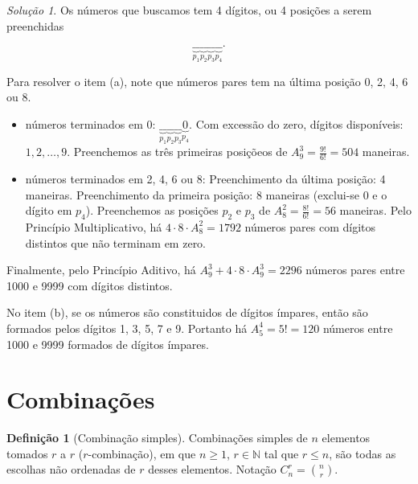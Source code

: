 \documentclass[]{book}
\theoremstyle{definition}
\newtheorem{definition}{Definição}[chapter]
\theoremstyle{definition}
\theoremstyle{definition}
\theoremstyle{remark}
\newtheorem*{solution}{Solução}
\begin{document}
\begin{solution}
\iffalse{} {Solução. } \fi{}Os números que buscamos tem 4 dígitos, ou 4 posições a serem preenchidas

\[
  \underbrace{\_\_}_{p_1}\underbrace{\_\_}_{p_2}\underbrace{\_\_}_{p_3}\underbrace{\_\_}_{p_4}.
\]

Para resolver o item (a), note que números pares tem na última posição 0, 2, 4, 6 ou 8.

\begin{itemize}
\item
  números terminados em 0: \(\underbrace{\_\_}_{p_1}\underbrace{\_\_}_{p_2}\underbrace{\_\_}_{p_3}\underbrace{0}_{p_4}\).
  Com excessão do zero, dígitos disponíveis: \(1,2,\ldots,9\).
  Preenchemos as três primeiras posiçõeos de \(A^{3}_{9}=\frac{9!}{6!}=504\) maneiras.
\item
  números terminados em 2, 4, 6 ou 8:
  Preenchimento da última posição: 4 maneiras.
  Preenchimento da primeira posição: 8 maneiras (exclui-se 0 e o dígito em \(p_4\)).
  Preenchemos as posições \(p_2\) e \(p_3\) de \(A^{2}_{8}=\frac{8!}{6!}=56\) maneiras.
  Pelo Princípio Multiplicativo, há \(4\cdot 8\cdot A^{2}_{8} = 1792\) números pares com dígitos distintos que não terminam em zero.
\end{itemize}

Finalmente, pelo Princípio Aditivo, há \(A^{3}_{9} + 4\cdot 8 \cdot A^{3}_{9} = 2296\) números pares entre 1000 e 9999 com dígitos distintos.

No item (b), se os números são constituidos de dígitos ímpares, então são formados pelos dígitos 1, 3, 5, 7 e 9.
Portanto há \(A^4_5=5!=120\) números entre 1000 e 9999 formados de dígitos ímpares.
\end{solution}

\hypertarget{combinauxe7uxf5es}{%
\section{Combinações}\label{combinauxe7uxf5es}}

\begin{definition}[Combinação simples]
\protect\hypertarget{def:defComb}{}{\label{def:defComb} \iffalse (Combinação simples) \fi{} }Combinações simples de \(n\) elementos tomados \(r\) a \(r\) (\(r\)-combinação), em que \(n \geq 1\), \(r \in \mathbb{N}\) tal que \(r \leq n\), são todas as escolhas não ordenadas de \(r\) desses elementos.
Notação \(C^r_n = {n\choose r}\).
\end{definition}
\end{document}
